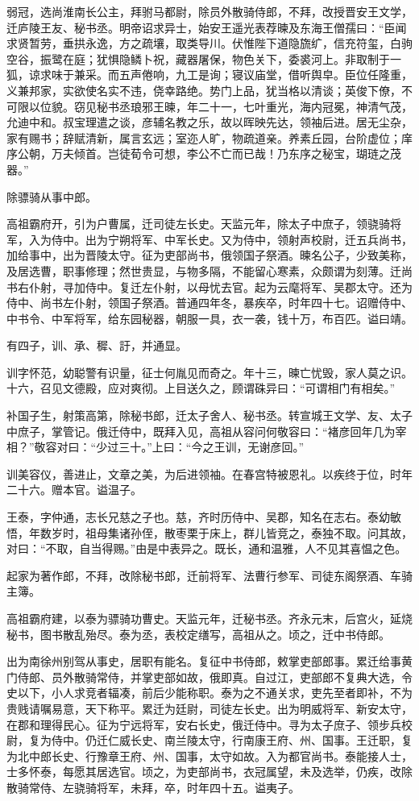 \documentclass[12pt,UTF8]{ctexbook}
\begin{document}
弱冠，选尚淮南长公主，拜驸马都尉，除员外散骑侍郎，不拜，改授晋安王文学，迁庐陵王友、秘书丞。明帝诏求异士，始安王遥光表荐暕及东海王僧孺曰：“臣闻求贤暂劳，垂拱永逸，方之疏壤，取类导川。伏惟陛下道隐旒纩，信充符玺，白驹空谷，振鹭在庭；犹惧隐鳞卜祝，藏器屠保，物色关下，委裘河上。非取制于一狐，谅求味于兼采。而五声倦响，九工是询；寝议庙堂，借听舆皁。臣位任隆重，义兼邦家，实欲使名实不违，侥幸路绝。势门上品，犹当格以清谈；英俊下僚，不可限以位貌。窃见秘书丞琅邪王暕，年二十一，七叶重光，海内冠冕，神清气茂，允迪中和。叔宝理遣之谈，彦辅名教之乐，故以晖映先达，领袖后进。居无尘杂，家有赐书；辞赋清新，属言玄远；室迩人旷，物疏道亲。养素丘园，台阶虚位；庠序公朝，万夫倾首。岂徒荀令可想，李公不亡而已哉！乃东序之秘宝，瑚琏之茂器。”

除骠骑从事中郎。

高祖霸府开，引为户曹属，迁司徒左长史。天监元年，除太子中庶子，领骁骑将军，入为侍中。出为宁朔将军、中军长史。又为侍中，领射声校尉，迁五兵尚书，加给事中，出为晋陵太守。征为吏部尚书，俄领国子祭酒。暕名公子，少致美称，及居选曹，职事修理；然世贵显，与物多隔，不能留心寒素，众颇谓为刻薄。迁尚书右仆射，寻加侍中。复迁左仆射，以母忧去官。起为云麾将军、吴郡太守。还为侍中、尚书左仆射，领国子祭酒。普通四年冬，暴疾卒，时年四十七。诏赠侍中、中书令、中军将军，给东园秘器，朝服一具，衣一袭，钱十万，布百匹。谥曰靖。

有四子，训、承、穉、訏，并通显。

训字怀范，幼聪警有识量，征士何胤见而奇之。年十三，暕亡忧毁，家人莫之识。十六，召见文德殿，应对爽彻。上目送久之，顾谓硃异曰：“可谓相门有相矣。”

补国子生，射策高第，除秘书郎，迁太子舍人、秘书丞。转宣城王文学、友、太子中庶子，掌管记。俄迁侍中，既拜入见，高祖从容问何敬容曰：“褚彦回年几为宰相？”敬容对曰：“少过三十。”上曰：“今之王训，无谢彦回。”

训美容仪，善进止，文章之美，为后进领袖。在春宫特被恩礼。以疾终于位，时年二十六。赠本官。谥温子。

王泰，字仲通，志长兄慈之子也。慈，齐时历侍中、吴郡，知名在志右。泰幼敏悟，年数岁时，祖母集诸孙侄，散枣栗于床上，群儿皆竞之，泰独不取。问其故，对曰：“不取，自当得赐。”由是中表异之。既长，通和温雅，人不见其喜愠之色。

起家为著作郎，不拜，改除秘书郎，迁前将军、法曹行参军、司徒东阁祭酒、车骑主簿。

高祖霸府建，以泰为骠骑功曹史。天监元年，迁秘书丞。齐永元末，后宫火，延烧秘书，图书散乱殆尽。泰为丞，表校定缮写，高祖从之。顷之，迁中书侍郎。

出为南徐州别驾从事史，居职有能名。复征中书侍郎，敕掌吏部郎事。累迁给事黄门侍郎、员外散骑常侍，并掌吏部如故，俄即真。自过江，吏部郎不复典大选，令史以下，小人求竞者辐凑，前后少能称职。泰为之不通关求，吏先至者即补，不为贵贱请嘱易意，天下称平。累迁为廷尉，司徒左长史。出为明威将军、新安太守，在郡和理得民心。征为宁远将军，安右长史，俄迁侍中。寻为太子庶子、领步兵校尉，复为侍中。仍迁仁威长史、南兰陵太守，行南康王府、州、国事。王迁职，复为北中郎长史、行豫章王府、州、国事，太守如故。入为都官尚书。泰能接人士，士多怀泰，每愿其居选官。顷之，为吏部尚书，衣冠属望，未及选举，仍疾，改除散骑常侍、左骁骑将军，未拜，卒，时年四十五。谥夷子。
\end{document}
